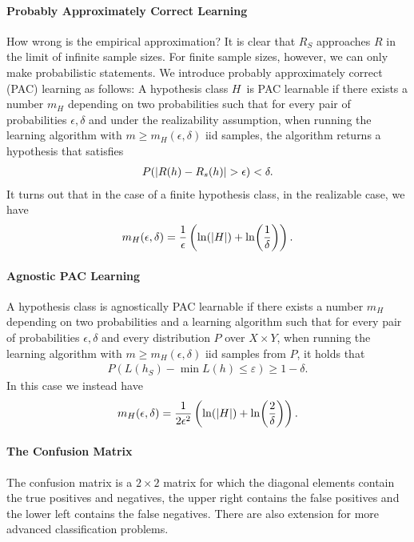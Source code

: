 \paragraph{Probably Approximately Correct Learning}
How wrong is the empirical approximation? It is clear that $R_{S}$ approaches $R$ in the limit of infinite sample sizes. For finite sample sizes, however, we can only make probabilistic statements. We introduce probably approximately correct (PAC) learning as follows: A hypothesis class $H$ is PAC learnable if there exists a number $m_{H}$ depending on two probabilities such that for every pair of probabilities $\epsilon, \delta$ and under the realizability assumption, when running the learning algorithm with $m\geq m_{H}(\epsilon, \delta)$ iid samples, the algorithm returns a hypothesis that satisfies
\begin{align*}
	P(\abs{R(h) - R_{s}(h)} > \epsilon) < \delta.
\end{align*}
It turns out that in the case of a finite hypothesis class, in the realizable case, we have
\begin{align*}
	m_{H}(\epsilon, \delta) = \frac{1}{\epsilon}\left(\ln(\abs{H}) + \ln(\frac{1}{\delta})\right).
\end{align*}

\paragraph{Agnostic PAC Learning}
A hypothesis class is agnostically PAC learnable if there exists a number $m_{H}$ depending on two probabilities and a learning algorithm such that for every pair of probabilities $\epsilon, \delta$ and every distribution $P$ over $X\times Y$, when running the learning algorithm with $m\geq m_{H}(\epsilon, \delta)$ iid samples from $P$, it holds that
\begin{align*}
	P(L(h_{S}) - \min L(h) \leq \varepsilon) \geq 1 - \delta.
\end{align*}
In this case we instead have
\begin{align*}
	m_{H}(\epsilon, \delta) = \frac{1}{2\epsilon^{2}}\left(\ln(\abs{H}) + \ln(\frac{2}{\delta})\right).
\end{align*}

\paragraph{The Confusion Matrix}
The confusion matrix is a $2\times 2$ matrix for which the diagonal elements contain the true positives and negatives, the upper right contains the false positives and the lower left contains the false negatives. There are also extension for more advanced classification problems.

